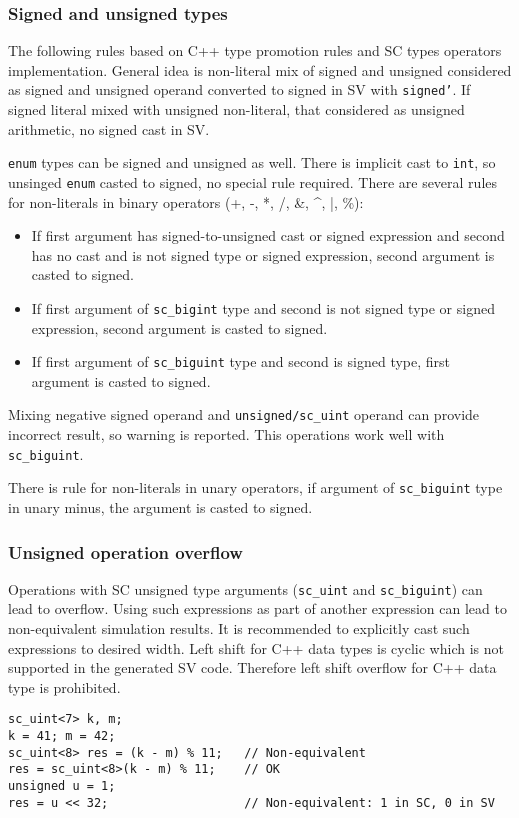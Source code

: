 \subsubsection{Signed and unsigned types}

The following rules based on C++ type promotion rules and SC types operators implementation.
General idea is non-literal mix of signed and unsigned considered as signed and unsigned operand converted to signed in SV with {\tt signed'}. If signed literal mixed with unsigned non-literal, that considered as unsigned arithmetic, no signed cast in SV.

{\tt enum} types can be signed and unsigned as well. There is implicit cast to {\tt int}, so unsinged {\tt enum} casted to signed, no special rule required.
There are several rules for non-literals in binary operators (+, -, *, /, \&, \textasciicircum, |, \%):
%
\begin{itemize}
\item If first argument has signed-to-unsigned cast or signed expression and second has no cast and is not signed type or signed expression, second argument is casted to signed.
\item If first argument of {\tt sc\_bigint} type and second is not signed type or signed expression, second argument is casted to signed.
\item If first argument of {\tt sc\_biguint} type and second is signed type, first argument is casted to signed.
\end{itemize}
%
Mixing negative signed operand and {\tt unsigned/sc\_uint} operand can provide incorrect result, so warning is reported. This operations work well with {\tt sc\_biguint}.

There is rule for non-literals in unary operators, if argument of {\tt sc\_biguint} type in unary minus, the argument is casted to signed.

\subsubsection{Unsigned operation overflow}

Operations with SC unsigned type arguments ({\tt sc\_uint} and {\tt sc\_biguint}) can lead to overflow. Using such expressions as part of another expression can lead to non-equivalent simulation results. It is recommended to explicitly cast such expressions to desired width. Left shift for C++ data types is cyclic which is not supported in the generated SV code. Therefore left shift overflow for C++ data type is prohibited.
%
\begin{lstlisting}[style=mycpp]
sc_uint<7> k, m;
k = 41; m = 42;
sc_uint<8> res = (k - m) % 11;   // Non-equivalent
res = sc_uint<8>(k - m) % 11;    // OK
unsigned u = 1;
res = u << 32;                   // Non-equivalent: 1 in SC, 0 in SV
\end{lstlisting}


